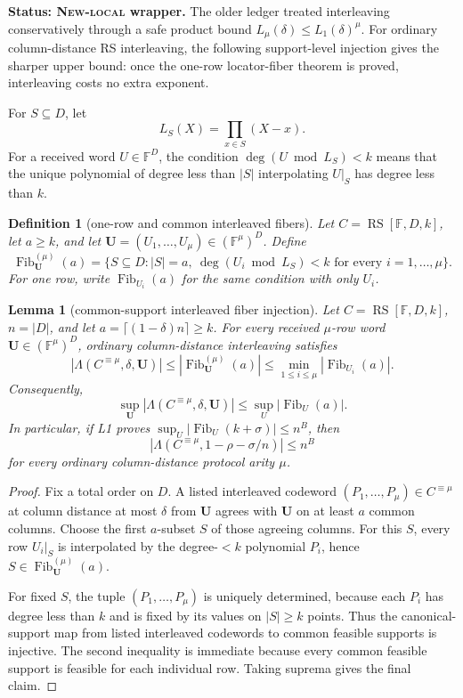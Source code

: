 \documentclass[11pt]{article}
\newtheorem{lemma}{Lemma}
\newtheorem{definition}{Definition}
\newcommand{\F}{\mathbb F}
\newcommand{\RS}{\operatorname{RS}}
\newcommand{\Fib}{\operatorname{Fib}}
\newcommand{\Lam}{\Lambda}
\begin{document}
\textbf{Status: \textsc{New-local} wrapper.}
The older ledger treated interleaving conservatively through a safe product
bound \(L_\mu(\delta)\le L_1(\delta)^\mu\).  For ordinary column-distance RS
interleaving, the following support-level injection gives the sharper upper
bound: once the one-row locator-fiber theorem is proved, interleaving costs no
extra exponent.

For \(S\subseteq D\), let
\[
  L_S(X)=\prod_{x\in S}(X-x).
\]
For a received word \(U\in\F^D\), the condition \(\deg(U\bmod L_S)<k\) means
that the unique polynomial of degree less than \(|S|\) interpolating \(U|_S\)
has degree less than \(k\).

\begin{definition}[one-row and common interleaved fibers]
Let \(C=\RS[\F,D,k]\), let \(a\ge k\), and let
\(\mathbf U=(U_1,\ldots,U_\mu)\in(\F^\mu)^D\).  Define
\[
  \Fib^{(\mu)}_{\mathbf U}(a)
  =
  \{S\subseteq D:
    |S|=a,\ \deg(U_i\bmod L_S)<k
    \text{ for every }i=1,\ldots,\mu\}.
\]
For one row, write \(\Fib_{U_i}(a)\) for the same condition with only \(U_i\).
\end{definition}

\begin{lemma}[common-support interleaved fiber injection]
\label{lem:common-support-interleaved-fiber-injection}
Let \(C=\RS[\F,D,k]\), \(n=|D|\), and let
\(a=\lceil(1-\delta)n\rceil\ge k\).  For every received \(\mu\)-row word
\(\mathbf U\in(\F^\mu)^D\), ordinary column-distance interleaving satisfies
\[
  |\Lam(C^{\equiv\mu},\delta,\mathbf U)|
  \le |\Fib^{(\mu)}_{\mathbf U}(a)|
  \le \min_{1\le i\le\mu}|\Fib_{U_i}(a)|.
\]
Consequently,
\[
  \sup_{\mathbf U}|\Lam(C^{\equiv\mu},\delta,\mathbf U)|
  \le \sup_U |\Fib_U(a)|.
\]
In particular, if L1 proves \(\sup_U|\Fib_U(k+\sigma)|\le n^B\), then
\[
  |\Lam(C^{\equiv\mu},1-\rho-\sigma/n)|\le n^B
\]
for every ordinary column-distance protocol arity \(\mu\).
\end{lemma}

\begin{proof}
Fix a total order on \(D\).  A listed interleaved codeword
\((P_1,\ldots,P_\mu)\in C^{\equiv\mu}\) at column distance at most \(\delta\) from
\(\mathbf U\) agrees with \(\mathbf U\) on at least \(a\) common columns.  Choose
the first \(a\)-subset \(S\) of those agreeing columns.  For this \(S\), every
row \(U_i|_S\) is interpolated by the degree-\(<k\) polynomial \(P_i\), hence
\(S\in\Fib^{(\mu)}_{\mathbf U}(a)\).

For fixed \(S\), the tuple \((P_1,\ldots,P_\mu)\) is uniquely determined,
because each \(P_i\) has degree less than \(k\) and is fixed by its values on
\(|S|\ge k\) points.  Thus the canonical-support map from listed interleaved
codewords to common feasible supports is injective.  The second inequality is
immediate because every common feasible support is feasible for each individual
row.  Taking suprema gives the final claim.
\end{proof}
\end{document}
